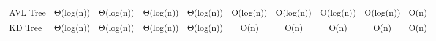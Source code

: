 \begin{table}[]
\begin{tabular}{lccccccccc}
    \cellcolor[HTML]{F1ECB6}AVL Tree                                                                    & Θ(log(n))                         & Θ(log(n))                         & Θ(log(n))                         & Θ(log(n))                         & O(log(n))                     & O(log(n))                     & O(log(n))                        & O(log(n))                       & \cellcolor[HTML]{FFFF10}O(n)                                           \\
    \rowcolor[HTML]{FFFF10} 
    \cellcolor[HTML]{F1ECB6}KD Tree                                                                     & \cellcolor[HTML]{B1EA0D}Θ(log(n)) & \cellcolor[HTML]{B1EA0D}Θ(log(n)) & \cellcolor[HTML]{B1EA0D}Θ(log(n)) & \cellcolor[HTML]{B1EA0D}Θ(log(n)) & O(n)                          & O(n)                          & O(n)                             & O(n)                            & O(n)                                                                  
    \end{tabular}
    \end{table}